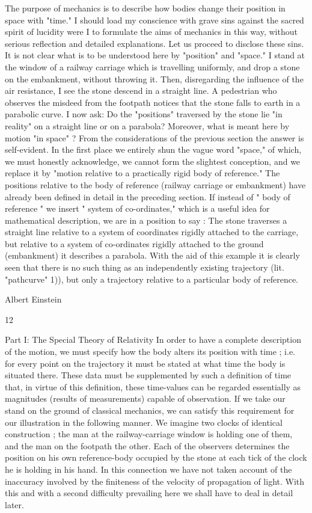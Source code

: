 \documentclass{article}
\begin{document}
The purpose of mechanics is to describe how bodies change their position in space with
"time." I should load my conscience with grave sins against the sacred spirit of lucidity
were I to formulate the aims of mechanics in this way, without serious reflection and
detailed explanations. Let us proceed to disclose these sins.
It is not clear what is to be understood here by "position" and "space." I stand at the
window of a railway carriage which is travelling uniformly, and drop a stone on the
embankment, without throwing it. Then, disregarding the influence of the air resistance, I
see the stone descend in a straight line. A pedestrian who observes the misdeed from the
footpath notices that the stone falls to earth in a parabolic curve. I now ask: Do the
"positions" traversed by the stone lie "in reality" on a straight line or on a parabola?
Moreover, what is meant here by motion "in space" ? From the considerations of the
previous section the answer is self-evident. In the first place we entirely shun the vague
word "space," of which, we must honestly acknowledge, we cannot form the slightest
conception, and we replace it by "motion relative to a practically rigid body of reference."
The positions relative to the body of reference (railway carriage or embankment) have
already been defined in detail in the preceding section. If instead of " body of reference "
we insert " system of co-ordinates," which is a useful idea for mathematical description, we
are in a position to say : The stone traverses a straight line relative to a system of coordinates rigidly attached to the carriage, but relative to a system of co-ordinates rigidly
attached to the ground (embankment) it describes a parabola. With the aid of this example it
is clearly seen that there is no such thing as an independently existing trajectory (lit. "pathcurve" 1)), but only a trajectory relative to a particular body of reference.

Albert Einstein

12

Part I: The Special Theory of Relativity
In order to have a complete description of the motion, we must specify how the body
alters its position with time ; i.e. for every point on the trajectory it must be stated at what
time the body is situated there. These data must be supplemented by such a definition of
time that, in virtue of this definition, these time-values can be regarded essentially as
magnitudes (results of measurements) capable of observation. If we take our stand on the
ground of classical mechanics, we can satisfy this requirement for our illustration in the
following manner. We imagine two clocks of identical construction ; the man at the
railway-carriage window is holding one of them, and the man on the footpath the other.
Each of the observers determines the position on his own reference-body occupied by the
stone at each tick of the clock he is holding in his hand. In this connection we have not
taken account of the inaccuracy involved by the finiteness of the velocity of propagation of
light. With this and with a second difficulty prevailing here we shall have to deal in detail
later.
\end{document}
